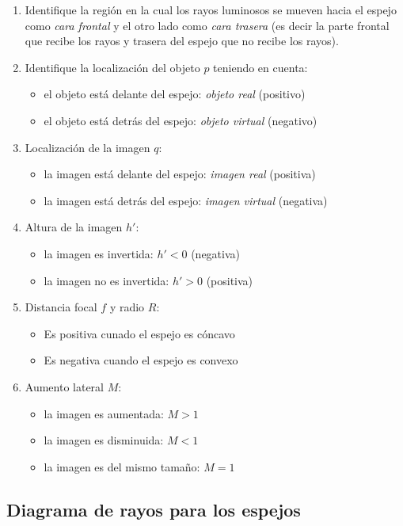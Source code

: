 \begin{enumerate}
  \item Identifique la región en la cual los rayos luminosos se mueven hacia el espejo como \textit{cara frontal} y el otro lado como \textit{cara trasera} (es decir la parte frontal que recibe los rayos y trasera del espejo que no recibe los rayos).
  \item Identifique la localización del objeto \(p\) teniendo en cuenta:
    \begin{itemize}
      \item el objeto está delante del espejo: \textit{objeto real} (positivo)
      \item el objeto está detrás del espejo: \textit{objeto virtual} (negativo)
    \end{itemize}
  \item  Localización de la imagen \(q\):
    \begin{itemize}
      \item la imagen está delante del espejo: \textit{imagen real} (positiva)
      \item la imagen está detrás del espejo: \textit{imagen virtual} (negativa)
    \end{itemize}
  \item Altura de la imagen \(h'\):
    \begin{itemize}
      \item la imagen es invertida: \(h' < 0\) (negativa)
      \item la imagen no es invertida: \(h' > 0\) (positiva)
    \end{itemize}
  \item Distancia focal \(f\) y radio \(R\):
    \begin{itemize}
      \item Es positiva cunado el espejo es cóncavo
      \item Es negativa cuando el espejo es convexo
    \end{itemize}
  \item Aumento lateral \(M\):
    \begin{itemize}
      \item la imagen es aumentada: \(M > 1\)
      \item la imagen es disminuida: \(M < 1\)
      \item la imagen es del mismo tamaño: \(M = 1\)
    \end{itemize}
\end{enumerate}

\subsection{Diagrama de rayos para los espejos}


